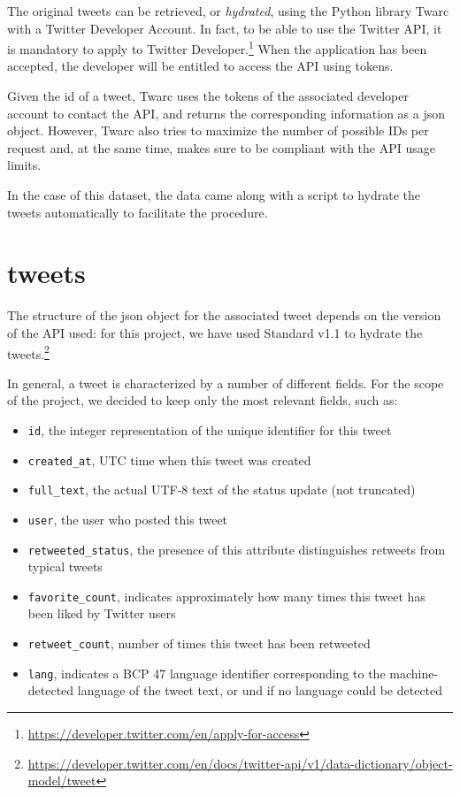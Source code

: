 The original tweets can be retrieved, or \textit{hydrated}, using the Python library Twarc with a Twitter Developer Account. In fact, to be able to use the Twitter API, it is mandatory to apply to Twitter Developer.\footnote{\url{https://developer.twitter.com/en/apply-for-access}} When the application has been accepted, the developer will be entitled to access the API using tokens. 

Given the id of a tweet, Twarc uses the tokens of the associated developer account to contact the API, and returns the corresponding information as a json object. However, Twarc also tries to maximize the number of possible IDs per request and, at the same time, makes sure to be compliant with the API usage limits.

In the case of this dataset, the data came along with a script to hydrate the tweets automatically to facilitate the procedure.

\section{tweets}
\label{sec:tweets}
The structure of the json object for the associated tweet depends on the version of the API used: for this project, we have used Standard v1.1 to hydrate the tweets.\footnote{\url{https://developer.twitter.com/en/docs/twitter-api/v1/data-dictionary/object-model/tweet}}

In general, a tweet is characterized by a number of different fields. For the scope of the project, we decided to keep only the most relevant fields, such as:

\begin{itemize}
	\item \texttt{id}, the integer representation of the unique identifier for this tweet
	\item \texttt{created\_at}, UTC time when this tweet was created
	\item \texttt{full\_text}, the actual UTF-8 text of the status update (not truncated)
	\item \texttt{user}, the user who posted this tweet
	\item \texttt{retweeted\_status}, the presence of this attribute distinguishes retweets from typical tweets
	\item \texttt{favorite\_count}, indicates approximately how many times this tweet has been liked by Twitter users
	\item \texttt{retweet\_count}, number of times this tweet has been retweeted
	\item \texttt{lang}, indicates a BCP 47 language identifier corresponding to the machine-detected language of the tweet text, or und if no language could be detected
\end{itemize}

